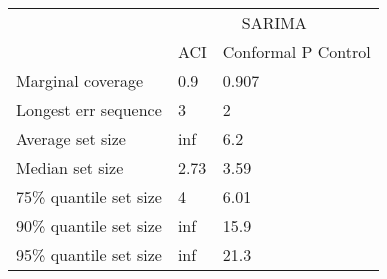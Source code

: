 \begin{tabular}{lll}
\toprule
& \multicolumn{2}{c}{SARIMA} \\
& ACI & Conformal P Control \\
\midrule
Marginal coverage & 0.9 & 0.907 \\
Longest err sequence & 3 & 2 \\
Average set size & inf & 6.2 \\
Median set size & 2.73 & 3.59 \\
75\% quantile set size & 4 & 6.01 \\
90\% quantile set size & inf & 15.9 \\
95\% quantile set size & inf & 21.3 \\
\bottomrule
\end{tabular}
